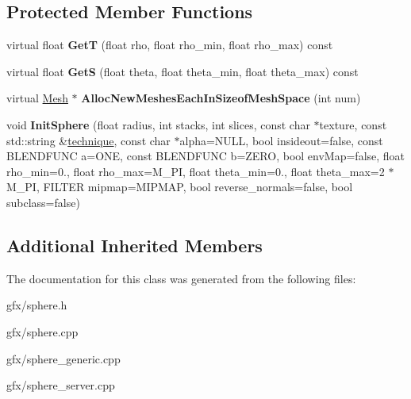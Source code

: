 \subsection*{Protected Member Functions}
\begin{DoxyCompactItemize}
\item 
virtual float {\bfseries GetT} (float rho, float rho\+\_\+min, float rho\+\_\+max) const \hypertarget{classSphereMesh_a549cbb450adc009a75ab07bb319db5a8}{}\label{classSphereMesh_a549cbb450adc009a75ab07bb319db5a8}

\item 
virtual float {\bfseries GetS} (float theta, float theta\+\_\+min, float theta\+\_\+max) const \hypertarget{classSphereMesh_a19933aed6fe874239770fc0f5239dc47}{}\label{classSphereMesh_a19933aed6fe874239770fc0f5239dc47}

\item 
virtual \hyperlink{classMesh}{Mesh} $\ast$ {\bfseries Alloc\+New\+Meshes\+Each\+In\+Sizeof\+Mesh\+Space} (int num)\hypertarget{classSphereMesh_a289429ca0178303d94a0984fdae4d1f1}{}\label{classSphereMesh_a289429ca0178303d94a0984fdae4d1f1}

\item 
void {\bfseries Init\+Sphere} (float radius, int stacks, int slices, const char $\ast$texture, const std\+::string \&\hyperlink{classMesh_a987e568f336befda6be200200a92509b}{technique}, const char $\ast$alpha=N\+U\+LL, bool insideout=false, const B\+L\+E\+N\+D\+F\+U\+NC a=O\+NE, const B\+L\+E\+N\+D\+F\+U\+NC b=Z\+E\+RO, bool env\+Map=false, float rho\+\_\+min=0., float rho\+\_\+max=M\+\_\+\+PI, float theta\+\_\+min=0., float theta\+\_\+max=2 $\ast$M\+\_\+\+PI, F\+I\+L\+T\+ER mipmap=M\+I\+P\+M\+AP, bool reverse\+\_\+normals=false, bool subclass=false)\hypertarget{classSphereMesh_a7047857961815d3a931b23aaf335147e}{}\label{classSphereMesh_a7047857961815d3a931b23aaf335147e}

\end{DoxyCompactItemize}
\subsection*{Additional Inherited Members}


The documentation for this class was generated from the following files\+:\begin{DoxyCompactItemize}
\item 
gfx/sphere.\+h\item 
gfx/sphere.\+cpp\item 
gfx/sphere\+\_\+generic.\+cpp\item 
gfx/sphere\+\_\+server.\+cpp\end{DoxyCompactItemize}
